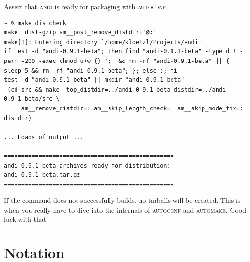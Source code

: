 \documentclass[a4paper,
  10pt,
  english,
  DIV=12,
  BCOR=8mm]{scrbook}
\newcommand{\algo}[1]{\textsc{{#1}}}
\newcommand{\andi}{\algo{andi} }
\newcommand{\todo}[1]{
  \marginpar{\fbox{\begin{minipage}{0.9\marginparwidth}
  \scriptsize\sloppy\raggedright #1
  \end{minipage}}}
}
\begin{document}
Assert that \andi is ready for packaging with \algo{autoconf}.

\begin{lstlisting}
~ % make distcheck
make  dist-gzip am__post_remove_distdir='@:'
make[1]: Entering directory `/home/kloetzl/Projects/andi'
if test -d "andi-0.9.1-beta"; then find "andi-0.9.1-beta" -type d ! -perm -200 -exec chmod u+w {} ';' && rm -rf "andi-0.9.1-beta" || { sleep 5 && rm -rf "andi-0.9.1-beta"; }; else :; fi
test -d "andi-0.9.1-beta" || mkdir "andi-0.9.1-beta"
 (cd src && make  top_distdir=../andi-0.9.1-beta distdir=../andi-0.9.1-beta/src \
     am__remove_distdir=: am__skip_length_check=: am__skip_mode_fix=: distdir)

... Loads of output ...

=================================================
andi-0.9.1-beta archives ready for distribution: 
andi-0.9.1-beta.tar.gz
=================================================
\end{lstlisting}

If the command does not successfully builds, no tarballs will be created. This is when you really have to dive into the internals of \algo{autoconf} and \algo{automake}. Good luck with that!



\chapter{Notation}
\todo{Cleanup}
\begin{acronym}[SA]
  \setlength{\itemsep}{-\parsep}
\end{acronym}
\end{document}
